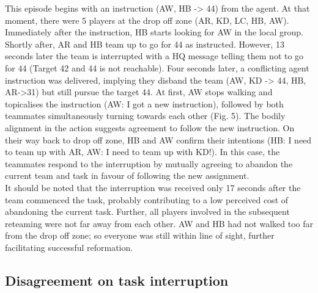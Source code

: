 This episode begins with an instruction (AW, HB -> 44) from the agent. At that moment, there were 5 players at the drop off zone (AR, KD, LC, HB, AW). Immediately after the instruction, HB starts looking for AW in the local group. Shortly after, AR and HB team up to go for 44 as instructed.  However, 13 seconds later the team is interrupted with a HQ message telling them not to go for 44 (Target 42 and 44 is not reachable). Four seconds later, a conflicting agent instruction was delivered, implying they disband the team (AW, KD -> 44, HB, AR->31) but still pursue the target 44. At first, AW stops walking and topicalises the instruction (AW: I got a new instruction), followed by both teammates simultaneously turning towards each other (Fig. 5). The bodily alignment in the action suggests agreement to follow the new instruction. On their way back to drop off zone, HB and AW confirm their intentions (HB: I need to team up with AR, AW: I need to team up with KD!). In this case, the teammates respond to the interruption by mutually agreeing to abandon the current team and task in favour of following the new assignment. \\

It should be noted that the interruption was received only 17 seconds after the team commenced the task, probably contributing to a low perceived cost of abandoning the current task. Further, all players involved in the subsequent reteaming were not far away from each other. AW and HB had not walked too far from the drop off zone; so everyone was still within line of sight, further facilitating successful reformation. \\

\subsection{Disagreement on task interruption}

